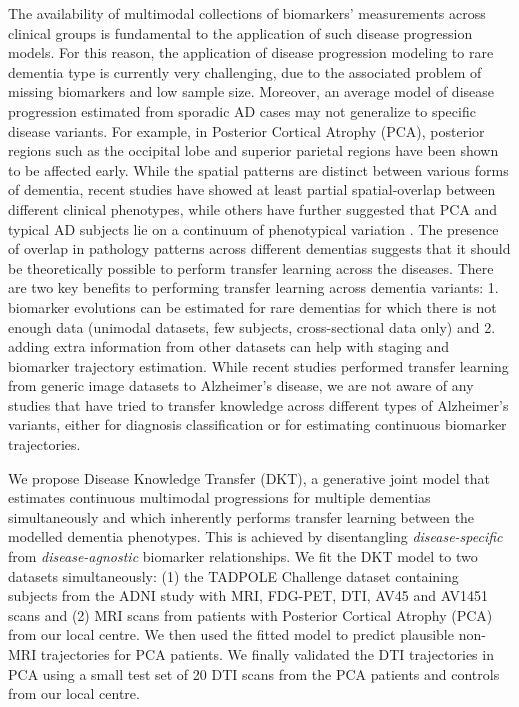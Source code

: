 \documentclass{llncs}
\begin{document}
The availability of multimodal collections of biomarkers' measurements across clinical groups is fundamental to the application of such disease progression models. For this reason, the application of disease progression modeling to rare dementia type is currently very challenging, due to the associated problem of missing biomarkers and low sample size.  Moreover, an average model of disease progression estimated from sporadic AD cases may not generalize to specific disease variants. For example, in Posterior Cortical Atrophy (PCA), posterior regions such as the occipital lobe and superior parietal regions have been shown to be affected early. While the spatial patterns are distinct between various forms of dementia, recent studies \cite{Ossenkoppele2014atrophy} have showed at least partial spatial-overlap between different clinical phenotypes, while others have further suggested that PCA and typical AD subjects lie on a continuum of phenotypical variation \cite{crutch2012posterior}. The presence of overlap in pathology patterns across different dementias suggests that it should be theoretically possible to perform transfer learning across the diseases. There are two key benefits to performing transfer learning across dementia variants: 1. biomarker evolutions can be estimated for rare dementias for which there is not enough data (unimodal datasets, few subjects, cross-sectional data only) and 2. adding extra information from other datasets can help with staging and biomarker trajectory estimation. While recent studies \cite{hon2017towards} performed transfer learning from generic image datasets to Alzheimer's disease, we are not aware of any studies that have tried to transfer knowledge across different types of Alzheimer's variants, either for diagnosis classification or for estimating continuous biomarker trajectories.


We propose Disease Knowledge Transfer (DKT), a generative joint model that estimates continuous multimodal progressions for multiple dementias simultaneously and which inherently performs transfer learning between the modelled dementia phenotypes. This is achieved by disentangling \emph{disease-specific} from \emph{disease-agnostic} biomarker relationships. We fit the DKT model to two datasets simultaneously: (1) the TADPOLE Challenge dataset containing subjects from the ADNI study with MRI, FDG-PET, DTI, AV45 and AV1451 scans and (2) MRI scans from patients with Posterior Cortical Atrophy (PCA) from our local centre. We then used the fitted model to predict plausible non-MRI trajectories for PCA patients. We finally validated the DTI trajectories in PCA using a small test set of 20 DTI scans from the PCA patients and controls from our local centre.
\end{document}
